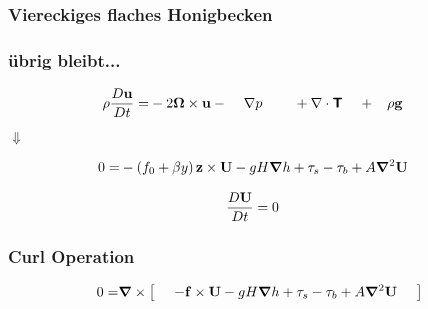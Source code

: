 \begin{frame}
	\frametitle{Viereckiges flaches Honigbecken}
\end{frame}

\begin{frame}
\frametitle{übrig bleibt...}
\begin{align}
	\rho \frac{D\mathbf{\bm{u}}}{Dt} 
	=
	&- 2\mathbf{\bm{\Omega}} \times \mathbf{\bm{u}} -\;\;\;\;\nabla p  \;\;\;\;\;\;\;\;    + \nabla \cdot\boldsymbol{\mathsf{T}}\;\;\;\; +\;\;\; \rho\mathbf{\bm{g}} \nonumber 
\end{align}
\begin{center}
	$\Downarrow$
\end{center}
\begin{align}
	0
	=
	&  -\left( f_{0} + \beta y \right) \mathbf{\bm{z}} \times \mathbf{\bm{U}} -    gH\mathbf{\bm{\nabla}}{h}  + \mathbf{\tau}_{s} - \mathbf{\tau}_{b}+ A\mathbf{\bm{\nabla}}^{2} \mathbf{\bm{U}} 
\end{align}

\begin{align}
	\frac{D\mathbf{\bm{U}}}{Dt}
	&=
	0
\end{align}
\end{frame}

\begin{frame}
\frametitle{Curl Operation}
\begin{align}
	0
	=&  \mathbf{\bm{\nabla}} \times \left[\;\;\;\;\;   -\mathbf{\bm{f}} \times \mathbf{\bm{U}}   -    g H \mathbf{\bm{\nabla}}{h} + \mathbf{\tau}_{s} - \mathbf{\tau}_{b} + A  \mathbf{\bm{\nabla}}^{2} \mathbf{\bm{U}} \;\;\;\;\;   \right]  \nonumber \\
     &     \nonumber 
\end{align}
\end{frame}

